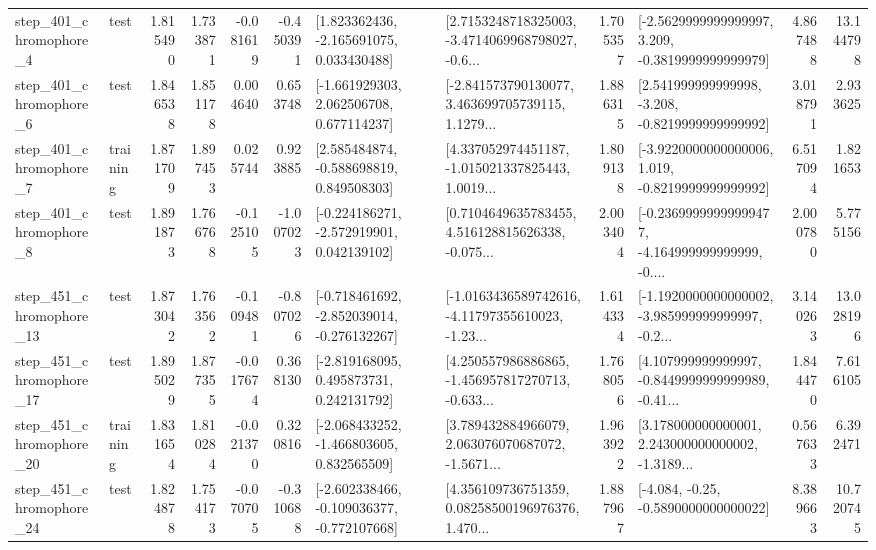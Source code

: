 \begin{tabular}{llrrrrllrlrr}
   step\_401\_chromophore\_4 &      test &      1.815490 &    1.733871 &     -0.081619 & -0.450391 &    [1.823362436, -2.165691075, 0.033430488] &  [2.7153248718325003, -3.4714069968798027, -0.6... &       1.705357 &  [-2.5629999999999997, 3.209, -0.3819999999999979] &            4.867488 &         13.144798 \\
   step\_401\_chromophore\_6 &      test &      1.846538 &    1.851178 &      0.004640 &  0.653748 &    [-1.661929303, 2.062506708, 0.677114237] &  [-2.841573790130077, 3.463699705739115, 1.1279... &       1.886315 &   [2.541999999999998, -3.208, -0.8219999999999992] &            3.018791 &          2.933625 \\
   step\_401\_chromophore\_7 &  training &      1.871709 &    1.897453 &      0.025744 &  0.923885 &    [2.585484874, -0.588698819, 0.849508303] &  [4.337052974451187, -1.015021337825443, 1.0019... &       1.809138 &  [-3.9220000000000006, 1.019, -0.8219999999999992] &            6.517094 &          1.821653 \\
   step\_401\_chromophore\_8 &      test &      1.891873 &    1.766768 &     -0.125105 & -1.007023 &   [-0.224186271, -2.572919901, 0.042139102] &  [0.7104649635783455, 4.516128815626338, -0.075... &       2.003404 &  [-0.23699999999999477, -4.164999999999999, -0.... &            2.000780 &          5.775156 \\
  step\_451\_chromophore\_13 &      test &      1.873042 &    1.763562 &     -0.109481 & -0.807026 &  [-0.718461692, -2.852039014, -0.276132267] &  [-1.0163436589742616, -4.11797355610023, -1.23... &       1.614334 &  [-1.1920000000000002, -3.985999999999997, -0.2... &            3.140263 &         13.028196 \\
  step\_451\_chromophore\_17 &      test &      1.895029 &    1.877355 &     -0.017674 &  0.368130 &    [-2.819168095, 0.495873731, 0.242131792] &  [4.250557986886865, -1.456957817270713, -0.633... &       1.768056 &  [4.107999999999997, -0.8449999999999989, -0.41... &            1.844470 &          7.616105 \\
  step\_451\_chromophore\_20 &  training &      1.831654 &    1.810284 &     -0.021370 &  0.320816 &   [-2.068433252, -1.466803605, 0.832565509] &  [3.789432884966079, 2.063076070687072, -1.5671... &       1.963922 &  [3.178000000000001, 2.243000000000002, -1.3189... &            0.567633 &          6.392471 \\
  step\_451\_chromophore\_24 &      test &      1.824878 &    1.754173 &     -0.070705 & -0.310688 &  [-2.602338466, -0.109036377, -0.772107668] &  [4.356109736751359, 0.08258500196976376, 1.470... &       1.887967 &               [-4.084, -0.25, -0.5890000000000022] &            8.389663 &         10.720745 \\

\end{tabular}
